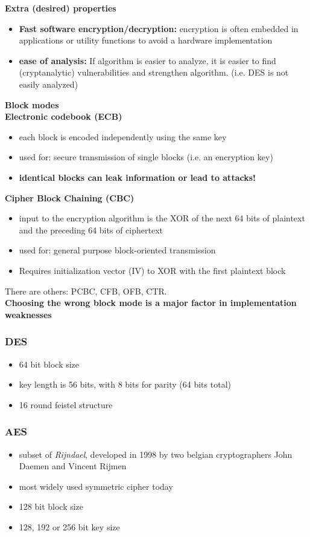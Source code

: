\documentclass{article}
\begin{document}
\textbf{Extra (desired) properties}
\begin{itemize}
    \item \textbf{Fast software encryption/decryption:} encryption is often embedded in applications or utility functions to avoid a hardware implementation
    \item \textbf{ease of analysis:} If algorithm is easier to analyze, it is easier to find (cryptanalytic) vulnerabilities and strengthen algorithm. (i.e. DES is not easily analyzed)
\end{itemize}
\textbf{Block modes}
\\\textbf{Electronic codebook (ECB)}
\begin{itemize}
    \item each block is encoded independently using the same key
    \item used for: secure transmission of single blocks (i.e. an encryption key)
    \item \textbf{identical blocks can leak information or lead to attacks!}
\end{itemize}
\textbf{Cipher Block Chaining (CBC)}
\begin{itemize}
    \item input to the encryption algorithm is the XOR of the next 64 bits of plaintext and the preceding 64 bits of ciphertext
    \item used for: general purpose block-oriented transmission
    \item Requires initialization vector (IV) to XOR with the first plaintext block
\end{itemize}
There are others: PCBC, CFB, OFB, CTR.
\\\textbf{Choosing the wrong block mode is a major factor in implementation weaknesses}
\subsubsection{DES}
\begin{itemize}
    \item 64 bit block size
    \item key length is 56 bits, with 8 bits for parity (64 bits total)
    \item 16 round feistel structure
\end{itemize}
\subsubsection{AES}
\begin{itemize}
    \item subset of \textit{Rijndael}, developed in 1998 by two belgian cryptographers John Daemen and Vincent Rijmen
    \item most widely used symmetric cipher today
    \item 128 bit block size
    \item 128, 192 or 256 bit key size
\end{itemize}
\end{document}
